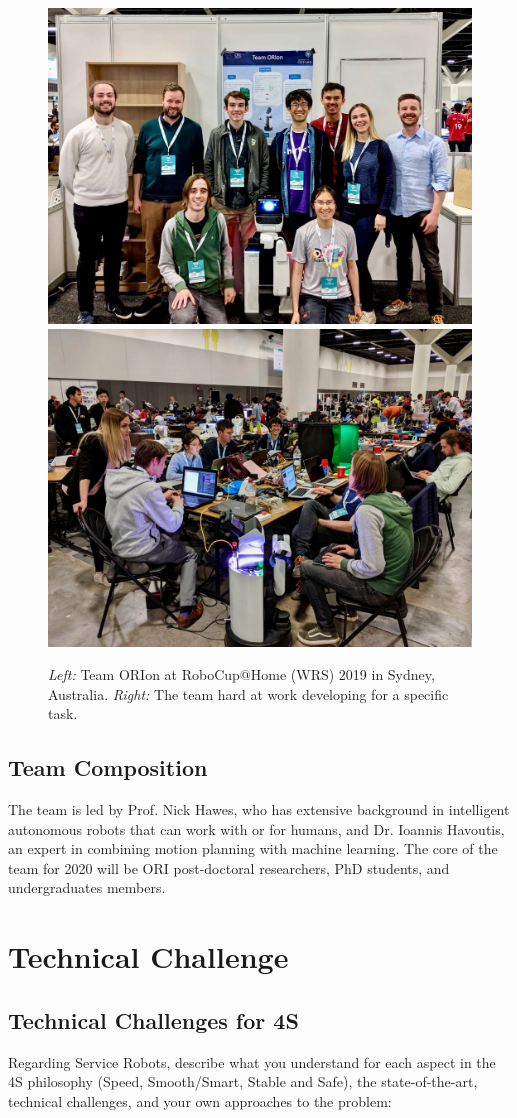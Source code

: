 \documentclass[runningheads,a4paper]{llncs}
\begin{document}
\begin{figure}[tb]
  \begin{center}
    \includegraphics[width=.48\columnwidth, clip, trim=0 0ex 0ex 50ex]{images/robocup_team.jpg}
    \includegraphics[width=.45\columnwidth, clip, trim=0 0ex 0ex 50ex]{images/robocup_team_working.jpg}
  \end{center} 
  \caption{\emph{Left:} Team ORIon at RoboCup@Home (WRS) 2019 in Sydney, Australia. \emph{Right:} The team hard at work developing for a specific task.}
  \label{fig:robocup}
\end{figure}

\subsection{Team Composition}

The team is led by Prof. Nick Hawes, who has extensive background in
intelligent autonomous robots that can work with or for humans, and Dr. Ioannis Havoutis, an expert in combining motion planning with machine learning. The core of the team for 2020 will be ORI post-doctoral researchers, PhD students, and undergraduates members.

\section{Technical Challenge}
\subsection{Technical Challenges for 4S}
 Regarding Service Robots, describe what you understand for each aspect in the 4S philosophy (Speed, Smooth/Smart, Stable and Safe), the state-of-the-art, technical challenges, and your own approaches to the problem:
\end{document}
